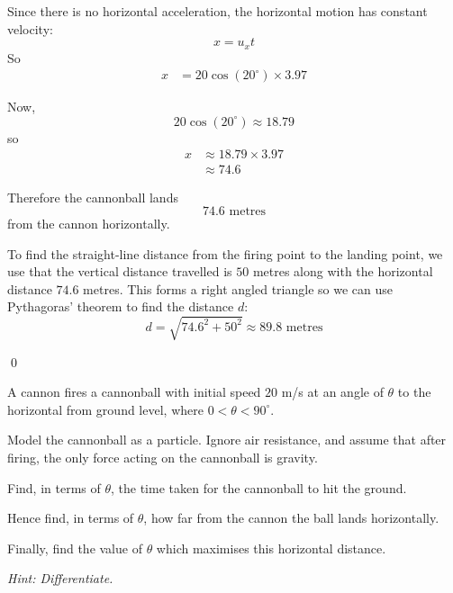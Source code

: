 \begin{solution}
Since there is no horizontal acceleration, the horizontal motion has constant velocity:
\[
x = u_xt
\]
So
\begin{align*}
    x &= 20\cos(20^\circ)\times 3.97
\end{align*}

Now,
\[
20\cos(20^\circ) \approx 18.79
\]
so
\begin{align*}
    x &\approx 18.79 \times 3.97 \\
      &\approx 74.6
\end{align*}

Therefore the cannonball lands
\[
74.6 \text{ metres}
\]
from the cannon horizontally.

To find the straight-line distance from the firing point to the landing point, we use that the vertical distance travelled is $50$ metres along with the horizontal distance $74.6$ metres. This forms a right angled triangle so we can use Pythagoras' theorem to find the distance $d$:
\[
d = \sqrt{74.6^2 + 50^2} \approx 89.8 \text{ metres}
\]


\qed
\end{solution}

\begin{example}
A cannon fires a cannonball with initial speed $20$ m/s at an angle of $\theta$ to the horizontal from ground level, where $0 < \theta < 90^\circ$.

Model the cannonball as a particle. Ignore air resistance, and assume that after firing, the only force acting on the cannonball is gravity.

Find, in terms of $\theta$, the time taken for the cannonball to hit the ground.

Hence find, in terms of $\theta$, how far from the cannon the ball lands horizontally.

Finally, find the value of $\theta$ which maximises this horizontal distance.

\textit{Hint: Differentiate.}
\end{example}

